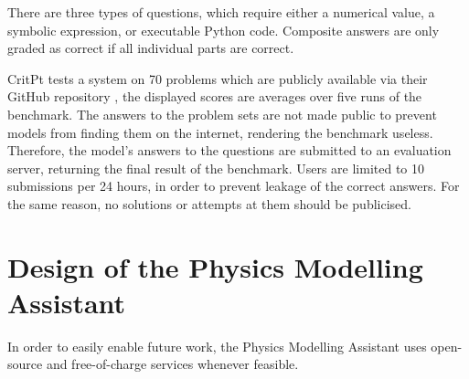 \documentclass[
	fontsize = 11pt,
	paper = a4,
	draft = false,
	twoside = true,
	titlepage = false
]{scrartcl}
\numberwithin{equation}{subsection}
\begin{document}
	There are three types of questions, which require either a numerical value, a symbolic expression, or executable Python code. Composite answers are only graded as correct if all individual parts are correct. \autocite{critPtArx}
	
	CritPt tests a system on 70 problems which are publicly available via their GitHub repository \autocite{critptGit}, the displayed scores are averages over five runs of the benchmark. The answers to the problem sets are not made public to prevent models from finding them on the internet, rendering the benchmark useless. Therefore, the model's answers to the questions are submitted to an evaluation server, returning the final result of the benchmark. Users are limited to 10 submissions per 24 hours, in order to prevent leakage of the correct answers. For the same reason, no solutions or attempts at them should be publicised. \autocite[p.~10]{critPtArx}
	
	\FloatBarrier
	\pagebreak
	\section{Design of the Physics Modelling Assistant}
	In order to easily enable future work, the Physics Modelling Assistant uses open-source and free-of-charge services whenever feasible.
	
\end{document}
